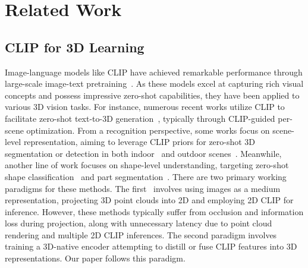 \section{Related Work}

\vspace{-0.5em}
\subsection{CLIP for 3D Learning}
\vspace{-0.5em}

Image-language models like CLIP have achieved remarkable performance through large-scale image-text pretraining~\cite{radford2021learning,jia2021scaling,li2022grounded,zhang2022glipv2,alayrac2022flamingo,ramesh2022hierarchical,saharia2022photorealistic}. As these models excel at capturing rich visual concepts and possess impressive zero-shot capabilities, they have been applied to various 3D vision tasks. For instance, numerous recent works utilize CLIP to facilitate zero-shot text-to-3D generation~\cite{hong2022avatarclip,jain2022zero,michel2022text2mesh,sanghi2022clip,lee2022understanding,canfes2023text,khalid2022text,aneja2022clipface,jetchev2021clipmatrix,xu2022dream3d,liu2022iss}, typically through CLIP-guided per-scene optimization. From a recognition perspective, some works focus on scene-level representation, aiming to leverage CLIP priors for zero-shot 3D segmentation or detection in both indoor~\cite{ha2022semantic,jatavallabhula2023conceptfusion,ding2022language,yang2023regionplc,lu2023open,peng2022openscene,zeng2023clip,huang2023joint,rozenberszki2022language,zhang2023clip,kerr2023lerf} and outdoor scenes~\cite{chen2023clip2scene,hess2022lidarclip}. Meanwhile, another line of work focuses on shape-level understanding, targeting zero-shot shape classification~\cite{zhang2022pointclip,zhu2022pointclipv2,qi2023contrast,xue2022ulip,hegde2023clip} and part segmentation~\cite{liu2022partslip,abdelreheem2023satr}. There are two primary working paradigms for these methods. The first~\cite{zhang2022pointclip,zhu2022pointclipv2,huang2022clip2point} involves using images as a medium representation, projecting 3D point clouds into 2D and employing 2D CLIP for inference. However, these methods typically suffer from occlusion and information loss during projection, along with unnecessary latency due to point cloud rendering and multiple 2D CLIP inferences. The second paradigm involves training a 3D-native encoder attempting to distill or fuse CLIP features into 3D representations. Our paper follows this paradigm.

